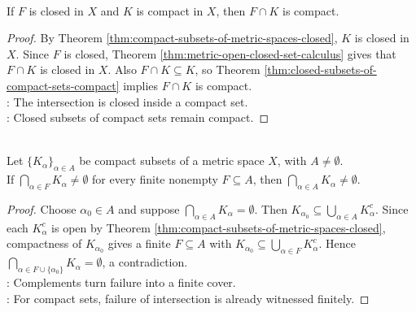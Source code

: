 \begin{corollary} \label{cor:closed-intersection-compact} \\
If $F$ is closed in $X$ and $K$ is compact in $X$, then $F\cap K$ is compact.
\begin{proof}
By Theorem \ref{thm:compact-subsets-of-metric-spaces-closed}, $K$ is closed in $X$. Since $F$ is closed, Theorem \ref{thm:metric-open-closed-set-calculus} gives that $F\cap K$ is closed in $X$. Also $F\cap K\subseteq K$, so Theorem \ref{thm:closed-subsets-of-compact-sets-compact} implies $F\cap K$ is compact.\\
: The intersection is closed inside a compact set.\\
: Closed subsets of compact sets remain compact.
\end{proof}
\end{corollary}

\begin{theorem} \label{thm:compact-finite-intersection-property} \\
Let $\{K_\alpha\}_{\alpha\in A}$ be compact subsets of a metric space $X$, with $A\neq\emptyset$.\\
If $\bigcap\limits_{\alpha\in F}K_\alpha\neq\emptyset$ for every finite nonempty $F\subseteq A$, then $\bigcap\limits_{\alpha\in A}K_\alpha\neq\emptyset$.
\begin{proof}
Choose $\alpha_0\in A$ and suppose $\bigcap\limits_{\alpha\in A}K_\alpha=\emptyset$. Then $K_{\alpha_0}\subseteq\bigcup\limits_{\alpha\in A}K_\alpha^c$. Since each $K_\alpha^c$ is open by Theorem \ref{thm:compact-subsets-of-metric-spaces-closed}, compactness of $K_{\alpha_0}$ gives a finite $F\subseteq A$ with $K_{\alpha_0}\subseteq\bigcup\limits_{\alpha\in F}K_\alpha^c$. Hence $\bigcap\limits_{\alpha\in F\cup\{\alpha_0\}}K_\alpha=\emptyset$, a contradiction.\\
: Complements turn failure into a finite cover.\\
: For compact sets, failure of intersection is already witnessed finitely.
\end{proof}
\end{theorem}

